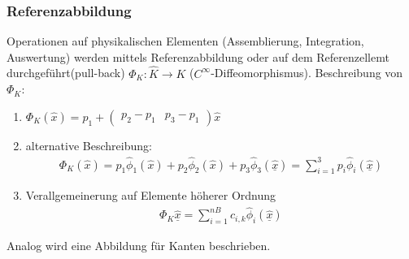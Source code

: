 \subsubsection{Referenzabbildung}
Operationen auf physikalischen Elementen (Assemblierung, Integration, Auswertung) werden mittels Referenzabbildung oder auf dem Referenzellemt durchgeführt(pull-back) $\Phi_K: \hat K \to K$ ($C^\infty$-Diffeomorphismus). Beschreibung von $\Phi_K$:
  \begin{enumerate}
  \item $\Phi_K (\hat x) = p_1 +
    \begin{pmatrix}
      p_2 - p_1 & p_3 -p_1
    \end{pmatrix}
\hat x$
\item alternative Beschreibung: 
  \begin{align*}
    \Phi_K (\hat x) = p_1 \hat \phi_1(\hat x) + p_2 \hat \phi_2(\hat x) + p_3 \hat \phi_3(\underline{\hat x}) = \sum_{i = 1}^3 p_i \hat \phi_i(\underline{\hat x})
  \end{align*}
\item Verallgemeinerung auf Elemente höherer Ordnung
  \begin{align*}
    \Phi_K \underline{\hat x} = \sum_{i = 1}^{nB} c_{i, k} \hat \phi_i (\underline{\hat x})
  \end{align*}
  \end{enumerate}
  \begin{bemerkung*}
    Analog wird eine Abbildung für Kanten beschrieben. 
  \end{bemerkung*}


